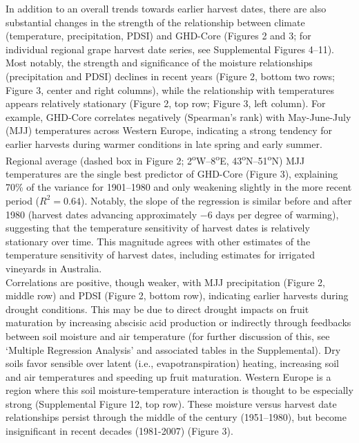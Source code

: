 \documentclass[final]{nature}
\begin{document}
\indent In addition to an overall trends towards earlier harvest dates, there are also substantial changes in the strength of the relationship between climate (temperature, precipitation, PDSI) and GHD-Core (Figures 2 and 3; for individual regional grape harvest date series, see Supplemental Figures 4--11). Most notably, the strength and significance of the moisture relationships (precipitation and PDSI) declines in recent years (Figure 2, bottom two rows; Figure 3, center and right columns), while the relationship with temperatures appears relatively stationary (Figure 2, top row; Figure 3, left column). For example, GHD-Core correlates negatively (Spearman's rank) with May-June-July (MJJ) temperatures across Western Europe, indicating a strong tendency for earlier harvests during warmer conditions in late spring and early summer. Regional average (dashed box in Figure 2; 2\textsuperscript{o}W--8\textsuperscript{o}E, 43\textsuperscript{o}N--51\textsuperscript{o}N) MJJ temperatures are the single best predictor of GHD-Core (Figure 3), explaining 70\% of the variance for 1901--1980 and only weakening slightly in the more recent period ($R^2=0.64$). Notably, the slope of the regression is similar before and after 1980 (harvest dates advancing approximately $-6$ days per degree of warming), suggesting that the temperature sensitivity of harvest dates is relatively stationary over time. This magnitude agrees with other estimates of the temperature sensitivity of harvest dates, including estimates for irrigated vineyards in Australia\cite{webb2012}.\\ %
\indent Correlations are positive, though weaker, with MJJ precipitation (Figure 2, middle row) and PDSI (Figure 2, bottom row), indicating earlier harvests during drought conditions. This may be due to direct drought impacts on fruit maturation by increasing abscisic acid production\cite{webb2012} or indirectly through feedbacks between soil moisture and air temperature (for further discussion of this, see `Multiple Regression Analysis' and associated tables in the Supplemental). Dry soils favor sensible over latent (i.e., evapotranspiration) heating, increasing soil and air temperatures and speeding up fruit maturation. Western Europe is a region where this soil moisture-temperature interaction is thought to be especially strong\cite{Seneviratne2006} (Supplemental Figure 12, top row). These moisture versus harvest date relationships persist through the middle of the century (1951--1980), but become insignificant in recent decades (1981-2007) (Figure 3).\\
\end{document}
